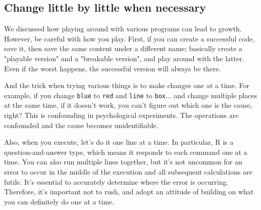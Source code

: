 \documentclass{ltjsbook}
\begin{document}
\subsection{Change little by little when necessary}
We discussed how playing around with various programs can lead to growth. However, be careful with how you play. First, if you can create a successful code, save it, then save the same content under a different name; basically create a "playable version" and a "breakable version", and play around with the latter. Even if the worst happens, the successful version will always be there.

And the trick when trying various things is to make changes one at a time. For example, if you change \texttt{blue} to \texttt{red} and \texttt{line} to \texttt{box}... and change multiple places at the same time, if it doesn't work, you can't figure out which one is the cause, right? This is confounding in psychological experiments. The operations are confounded and the cause becomes unidentifiable.

Also, when you execute, let's do it one line at a time. In particular, R is a question-and-answer type, which means it responds to each command one at a time. You can also run multiple lines together, but it's not uncommon for an error to occur in the middle of the execution and all subsequent calculations are futile. It's essential to accurately determine where the error is occurring. Therefore, it's important not to rush, and adopt an attitude of building on what you can definitely do one at a time.
\end{document}
